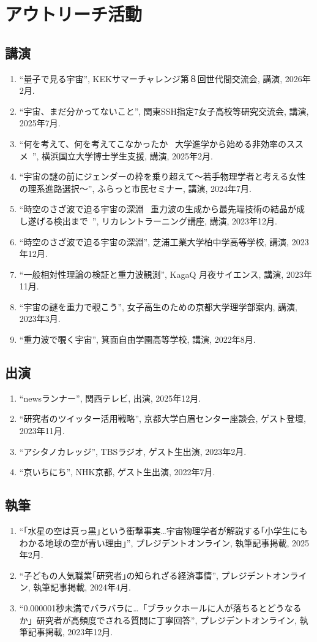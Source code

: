 \documentclass[uplatex, 11pt]{jsarticle}
\begin{document}

\section*{アウトリーチ活動}
\subsection*{講演}
\begin{enumerate}
\item “量子で見る宇宙”, KEKサマーチャレンジ第８回世代間交流会, 講演, 2026年2月.
\item “宇宙、まだ分かってないこと”, 関東SSH指定7女子高校等研究交流会, 講演, 2025年7月.
\item “何を考えて、何を考えてこなかったか ~大学進学から始める非効率のススメ~”, 横浜国立大学博士学生支援, 講演, 2025年2月.
\item “宇宙の謎の前にジェンダーの枠を乗り超えて〜若手物理学者と考える女性の理系進路選択〜”, ふらっと市民セミナー, 講演, 2024年7月.
\item “時空のさざ波で迫る宇宙の深淵 ~重力波の生成から最先端技術の結晶が成し遂げる検出まで~”, リカレントラーニング講座, 講演, 2023年12月.
\item “時空のさざ波で迫る宇宙の深淵”, 芝浦工業大学柏中学高等学校, 講演, 2023年12月.
\item “一般相対性理論の検証と重力波観測”, KagaQ 月夜サイエンス, 講演, 2023年11月.
\item “宇宙の謎を重力で覗こう”, 女子高生のための京都大学理学部案内, 講演, 2023年3月.
\item “重力波で覗く宇宙”, 箕面自由学園高等学校, 講演, 2022年8月.
\end{enumerate}
\subsection*{出演}
\begin{enumerate}
\item “newsランナー”, 関西テレビ, 出演, 2025年12月.
\item “研究者のツイッター活用戦略”, 京都大学白眉センター座談会, ゲスト登壇, 2023年11月.
\item “アシタノカレッジ”, TBSラジオ, ゲスト生出演, 2023年2月.
\item “京いちにち”, NHK京都, ゲスト生出演, 2022年7月.
\end{enumerate}
\subsection*{執筆}
\begin{enumerate}
\item “｢水星の空は真っ黒｣という衝撃事実…宇宙物理学者が解説する｢小学生にもわかる地球の空が青い理由｣”, プレジデントオンライン, 執筆記事掲載, 2025年2月.
\item “子どもの人気職業｢研究者｣の知られざる経済事情”, プレジデントオンライン, 執筆記事掲載, 2024年4月.
\item “0.000001秒未満でバラバラに…「ブラックホールに人が落ちるとどうなるか」研究者が高頻度でされる質問に丁寧回答”, プレジデントオンライン, 執筆記事掲載, 2023年12月.
\end{enumerate}
\end{document}
